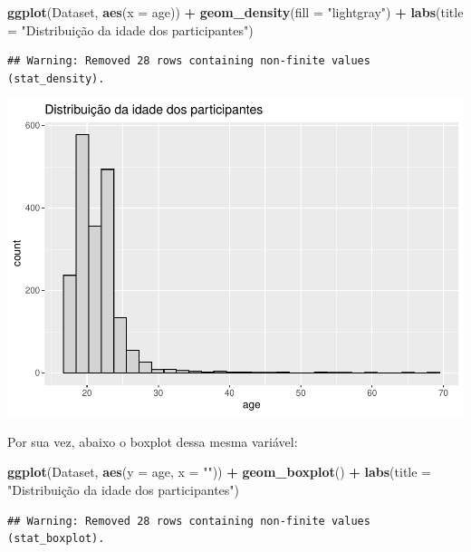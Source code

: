 \documentclass[
]{book}
\newenvironment{Shaded}{\begin{snugshade}}{\end{snugshade}}
\newcommand{\DataTypeTok}[1]{\textcolor[rgb]{0.13,0.29,0.53}{#1}}
\newcommand{\KeywordTok}[1]{\textcolor[rgb]{0.13,0.29,0.53}{\textbf{#1}}}
\newcommand{\NormalTok}[1]{#1}
\newcommand{\OperatorTok}[1]{\textcolor[rgb]{0.81,0.36,0.00}{\textbf{#1}}}
\newcommand{\StringTok}[1]{\textcolor[rgb]{0.31,0.60,0.02}{#1}}
\begin{document}
\begin{Shaded}
\begin{Highlighting}[]
\KeywordTok{ggplot}\NormalTok{(Dataset, }\KeywordTok{aes}\NormalTok{(}\DataTypeTok{x =}\NormalTok{ age)) }\OperatorTok{+}
\StringTok{  }\KeywordTok{geom_density}\NormalTok{(}\DataTypeTok{fill =} \StringTok{"lightgray"}\NormalTok{) }\OperatorTok{+}
\StringTok{  }\KeywordTok{labs}\NormalTok{(}\DataTypeTok{title =} \StringTok{"Distribuição da idade dos participantes"}\NormalTok{)}
\end{Highlighting}
\end{Shaded}

\begin{verbatim}
## Warning: Removed 28 rows containing non-finite values (stat_density).
\end{verbatim}

\includegraphics{gitbook-demo_files/figure-latex/unnamed-chunk-16-1.pdf}

Por sua vez, abaixo o boxplot dessa mesma variável:

\begin{Shaded}
\begin{Highlighting}[]
\KeywordTok{ggplot}\NormalTok{(Dataset, }\KeywordTok{aes}\NormalTok{(}\DataTypeTok{y =}\NormalTok{ age, }\DataTypeTok{x =} \StringTok{""}\NormalTok{)) }\OperatorTok{+}
\StringTok{  }\KeywordTok{geom_boxplot}\NormalTok{() }\OperatorTok{+}
\StringTok{  }\KeywordTok{labs}\NormalTok{(}\DataTypeTok{title =} \StringTok{"Distribuição da idade dos participantes"}\NormalTok{)}
\end{Highlighting}
\end{Shaded}

\begin{verbatim}
## Warning: Removed 28 rows containing non-finite values (stat_boxplot).
\end{verbatim}
\end{document}

